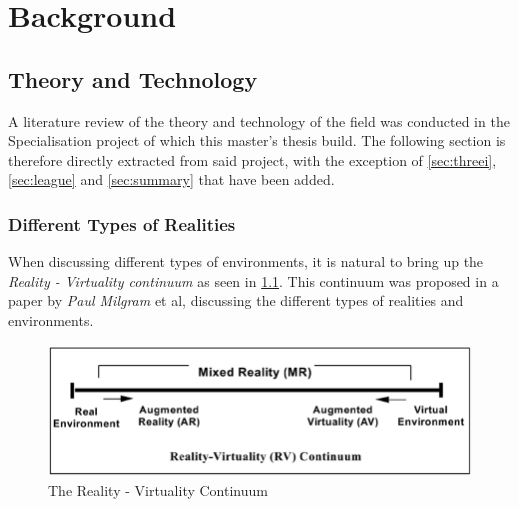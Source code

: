 \chapter{Background}
\label{chap:background}


\section{Theory and Technology}
    A literature review of the theory and technology of the field was conducted in the Specialisation project of which this master's thesis build. The following section is therefore directly extracted from said project\cite{specialisation}, with the exception of \cref{sec:threei}, \cref{sec:league} and \cref{sec:summary} that have been added.
    
    \subsection{Different Types of Realities}
        When discussing different types of environments, it is natural to bring up the \emph{Reality - Virtuality continuum} \cite{reality_virtuality_continuum} as seen in \cref{fig:reality_virtuality_continuum}. This continuum was proposed in a paper by \emph{Paul Milgram} et al, discussing the different types of realities and environments.
        
        \begin{figure}[!ht]
            \centering
            \includegraphics[width=\linewidth]{figures/reality_virtuality_continuum.png}
            \caption{The Reality - Virtuality Continuum}
            \label{fig:reality_virtuality_continuum}
        \end{figure}
        
